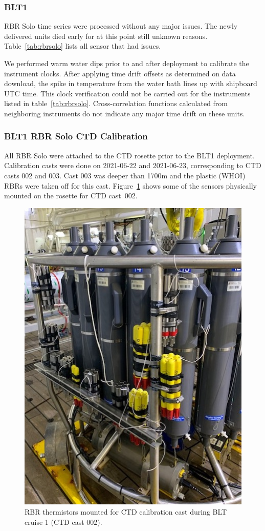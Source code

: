 \documentclass[10pt,letterpaper]{article}
\newcommand{\clink}[2]{{\color{modblue2} \href{#1}{#2}}}
\begin{document}
\subsubsection*{BLT1}
\label{sub:rbr_blt1}
RBR Solo time series were processed without any major issues. The newly delivered units died early for at this point still unknown reasons. Table~\ref{tab:rbrsolo} lists all sensor that had issues.

We performed warm water dips prior to and after deployment to calibrate the instrument clocks. After applying time drift offsets as determined on data download, the spike in temperature from the water bath lines up with shipboard UTC time. This clock verification could not be carried out for the instruments listed in table~\ref{tab:rbrsolo}. Cross-correlation functions calculated from neighboring instruments do not indicate any major time drift on these units.
  
\subsubsection*{BLT1 RBR Solo CTD Calibration}
\label{sub:blt1_rbr_ctd_calibration}
All RBR Solo were attached to the CTD rosette prior to the BLT1 deployment.
Calibration casts were done on 2021-06-22 and 2021-06-23, corresponding to CTD casts 002 and 003. Cast 003 was deeper than 1700m and the plastic (WHOI) RBRs were taken off for this cast. Figure~\ref{fig:blt1_rbr_calibration} shows some of the sensors physically mounted on the rosette for CTD cast~002.

\begin{figure}[htpb]
    \centering
    \includegraphics[width=0.6\linewidth]{fig/blt1_rbr_calibration.jpg}
    \caption{RBR thermistors mounted for CTD calibration cast during BLT cruise 1 (CTD cast 002).}
    \label{fig:blt1_rbr_calibration}
\end{figure}
\end{document}
